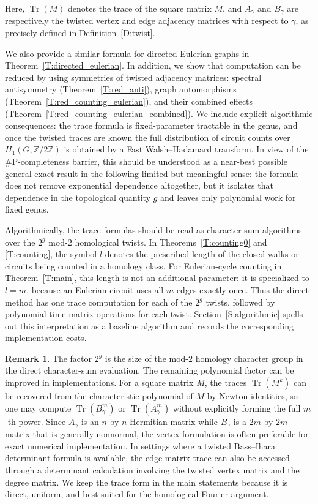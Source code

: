 \documentclass[11pt]{amsart}
\theoremstyle{plain}
\theoremstyle{definition}
\newtheorem{remark}[theorem]{Remark}
\newcommand{\mbbZ}{{\mathbb Z}}
\DeclareMathOperator{\trace}{\operatorname{Tr}}
\numberwithin{equation}{section}
\begin{document}
Here,  $\trace(M)$ denotes the trace of the square matrix  $M$, and $A_\gamma$ and $B_\gamma$ are respectively the twisted vertex and edge adjacency matrices with respect to $\gamma$, as precisely defined in Definition~\ref{D:twist}. 

We also provide a similar formula for directed Eulerian graphs in Theorem~\ref{T:directed_eulerian}. In addition, we show that computation can be reduced by using symmetries of twisted adjacency matrices: spectral antisymmetry (Theorem~\ref{T:red_anti}), graph automorphisms (Theorem~\ref{T:red_counting_eulerian}), and their combined effects (Theorem~\ref{T:red_counting_eulerian_combined}).  We include explicit algorithmic consequences: the trace formula is fixed-parameter tractable in the genus, and once the twisted traces are known the full distribution of circuit counts over $H_1(G,\mbbZ/2\mbbZ)$ is obtained by a Fast Walsh--Hadamard transform.  In view of the \#P-completeness barrier, this should be understood as a near-best possible general exact result in the following limited but meaningful sense: the formula does not remove exponential dependence altogether, but it isolates that dependence in the topological quantity $g$ and leaves only polynomial work for fixed genus.

Algorithmically, the trace formulas should be read as character-sum algorithms over the $2^g$ mod-$2$ homological twists.  In Theorems~\ref{T:counting0} and \ref{T:counting}, the symbol $l$ denotes the prescribed length of the closed walks or circuits being counted in a homology class.  For Eulerian-cycle counting in Theorem~\ref{T:main}, this length is not an additional parameter: it is specialized to $l=m$, because an Eulerian circuit uses all $m$ edges exactly once.  Thus the direct method has one trace computation for each of the $2^g$ twists, followed by polynomial-time matrix operations for each twist.  Section~\ref{S:algorithmic} spells out this interpretation as a baseline algorithm and records the corresponding implementation costs.

\begin{remark}
The factor $2^g$ is the size of the mod-$2$ homology character group in the direct character-sum evaluation.  The remaining polynomial factor can be improved in implementations.  For a square matrix $M$, the traces $\trace(M^k)$ can be recovered from the characteristic polynomial of $M$ by Newton identities, so one may compute $\trace(B_\gamma^m)$ or $\trace(A_\gamma^m)$ without explicitly forming the full $m$-th power.  Since $A_\gamma$ is an $n$ by $n$ Hermitian matrix while $B_\gamma$ is a $2m$ by $2m$ matrix that is generally nonnormal, the vertex formulation is often preferable for exact numerical implementation.  In settings where a twisted Bass--Ihara determinant formula is available, the edge-matrix trace can also be accessed through a determinant calculation involving the twisted vertex matrix and the degree matrix.  We keep the trace form in the main statements because it is direct, uniform, and best suited for the homological Fourier argument.
\end{remark}
\end{document}

